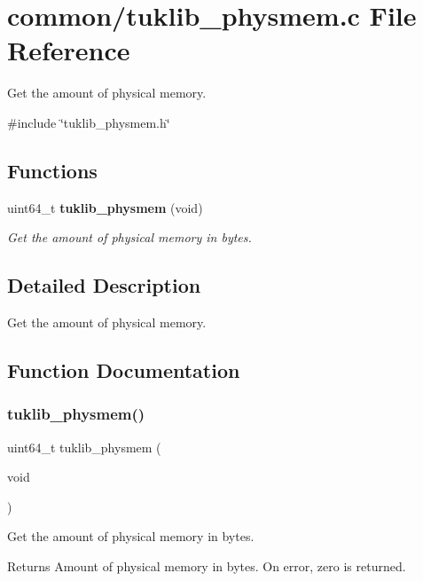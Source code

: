 \section{common/tuklib\+\_\+physmem.c File Reference}
\label{tuklib__physmem_8c}


Get the amount of physical memory.  


{\ttfamily \#include \char`\"{}tuklib\+\_\+physmem.\+h\char`\"{}}\newline
\subsection*{Functions}
\begin{DoxyCompactItemize}
\item 
uint64\+\_\+t \textbf{ tuklib\+\_\+physmem} (void)
\begin{DoxyCompactList}\small\item\em Get the amount of physical memory in bytes. \end{DoxyCompactList}\end{DoxyCompactItemize}


\subsection{Detailed Description}
Get the amount of physical memory. 



\subsection{Function Documentation}
\mbox{\label{tuklib__physmem_8c_abba29dea7d58aed682c6e9fad20838bd}} 
\subsubsection{tuklib\+\_\+physmem()}
{\footnotesize\ttfamily uint64\+\_\+t tuklib\+\_\+physmem (\begin{DoxyParamCaption}\item[{void}]{ }\end{DoxyParamCaption})}



Get the amount of physical memory in bytes. 

\begin{DoxyReturn}{Returns}
Amount of physical memory in bytes. On error, zero is returned. 
\end{DoxyReturn}
